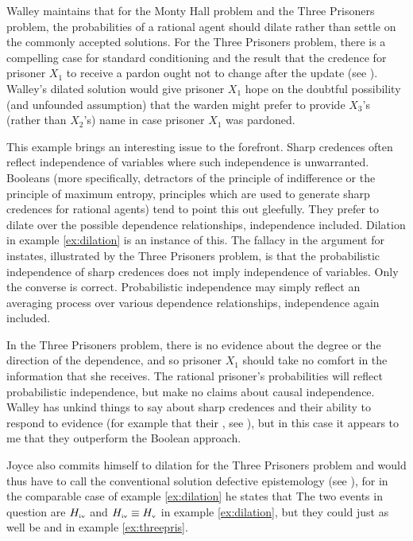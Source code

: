 \documentclass[11pt]{article}
\begin{document}
Walley maintains that for the Monty Hall problem and the Three
Prisoners problem, the probabilities of a rational agent should dilate
rather than settle on the commonly accepted solutions. For the Three
Prisoners problem, there is a compelling case for standard
conditioning and the result that the credence for prisoner $X_{1}$ to
receive a pardon ought not to change after the update (see
). Walley's dilated solution would give
prisoner $X_{1}$ hope on the doubtful possibility (and unfounded
assumption) that the warden might prefer to provide $X_{3}$'s (rather
than $X_{2}$'s) name in case prisoner $X_{1}$ was pardoned.

This example brings an interesting issue to the forefront. Sharp
credences often reflect independence of variables where such
independence is unwarranted. Booleans (more specifically, detractors
of the principle of indifference or the principle of maximum entropy,
principles which are used to generate sharp credences for rational
agents) tend to point this out gleefully. They prefer to dilate over
the possible dependence relationships, independence included. Dilation
in example \ref{ex:dilation} is an instance of this. The fallacy in
the argument for instates, illustrated by the Three Prisoners problem,
is that the probabilistic independence of sharp credences does not
imply independence of variables. Only the converse is correct.
Probabilistic independence may simply reflect an averaging process
over various dependence relationships, independence again included.

In the Three Prisoners problem, there is no evidence about the degree
or the direction of the dependence, and so prisoner $X_{1}$ should
take no comfort in the information that she receives. The rational
prisoner's probabilities will reflect probabilistic independence, but
make no claims about causal independence. Walley has unkind things to
say about sharp credences and their ability to respond to evidence
(for example that their ,
see ), but in this case it appears to me that
they outperform the Boolean approach.

Joyce also commits himself to dilation for the Three Prisoners problem
and would thus have to call the conventional solution defective
epistemology (see ), for in the comparable case
of example \ref{ex:dilation} he states that   The two events
in question are $H_{\mbox{\tiny{iv}}}$ and
$H_{\mbox{\tiny{iv}}}\equiv{}H_{\mbox{\tiny{v}}}$ in example
\ref{ex:dilation}, but they could just as well be  and  in
example \ref{ex:threepris}.
\end{document}
